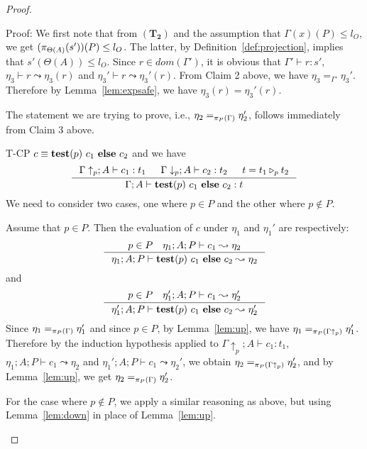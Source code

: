 {{{\begin{proof}
\begin{ProofEnumDesc}
\begin{itemize}
Proof: We first note that from $(\mathbf{T_2})$
and the assumption that $\Gamma(x)(P) \leq l_O$, we get
$(\app{s'}{\Theta(A)})(P) \leq l_O$.
The latter, by Definition~\ref{def:projection}, implies  that $s'(\Theta(A)) \leq l_O.$
Since $r \in dom(\Gamma')$, it is obvious that
$\Gamma' \vdash r : s'$,
$\eta_3 \vdash r \leadsto \eta_3(r)$
and $\eta_3' \vdash r \leadsto \eta_3'(r).$
From Claim 2 above, we have $\eta_3 =_{\Gamma'} \eta_3'$.
Therefore by Lemma~\ref{lem:expsafe}, we have
$\eta_3(r) = \eta_3'(r).$
\end{itemize}
The statement we are trying to prove, i.e., $\eta_2 =_{\app{\Gamma}{P}} \eta_2'$,
follows immediately from Claim 3 above.
\item[T-CP] $c\equiv\lcCP{p}{c_1}{c_2}$ and we have
$$
\inference
{\Gamma\uparrow_{p} ; A \vdash c_1 : t_1 &
\Gamma\downarrow_{p} ; A\vdash c_2 : t_2 &
t=\omerge {p} {t_1} {t_2}}
{\Gamma; A\vdash \lcCP{p}{c_1}{c_2} : t}
$$
We need to consider two cases, one where $p \in P$
and the other where $p \not \in P$.

Assume that $p \in P.$
Then the evaluation of $c$ under $\eta_1$ and $\eta_1'$
are respectively:
$$
\inference{p\in P \quad \eta_1; A; P \vdash c_1 \leadsto \eta_2}
{\eta_1; A ; P \vdash \lcCP{p}{c_1}{c_2} \leadsto \eta_2}
$$
and
$$
\inference
    {p\in P \quad \eta_1'; A; P \vdash c_1 \leadsto \eta_2'}
    {\eta_1'; A ; P \vdash \lcCP{p}{c_1}{c_2} \leadsto \eta_2'}
$$
Since $\eta_1 =_{\app{\Gamma}{P}} \eta_1'$ and since $p \in P$,
by Lemma~\ref{lem:up}, we have $\eta_1 =_{\app{\Gamma\uparrow_p}{P}} \eta_1'$.
Therefore by the induction hypothesis applied to $\Gamma\uparrow_p ; A \vdash c_1 : t_1$,
$\eta_1; A; P \vdash c_1 \leadsto \eta_2$ and
$\eta_1'; A; P \vdash c_1 \leadsto \eta_2'$, we obtain
$\eta_2 =_{\app{\Gamma\uparrow_p}{P}} \eta_2'$, and by Lemma~\ref{lem:up},
we get $\eta_2 =_{\app{\Gamma}{P}} \eta_2'$.

For the case where $p \not \in P$, we apply a similar reasoning as above,
but using Lemma~\ref{lem:down} in place of Lemma~\ref{lem:up}.
\end{ProofEnumDesc}
\end{proof}

}}}
